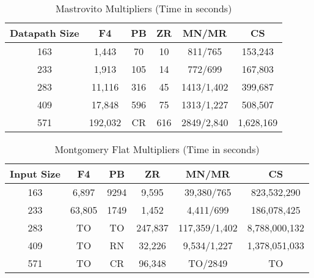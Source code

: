 \documentclass{article}
\begin{document}
\begin{table}
\centering
\caption{Mastrovito Multipliers (Time in seconds)}
\begin{tabular}{| c | c | c | c | c | c |} \hline
\textbf{Datapath Size} & \textbf{F4} & \textbf{PB} &\textbf{ZR} & \textbf{MN/MR} & \textbf{CS}\\ \hline
163 & 1,443 &70& 10 & 811/765 & 153,243\\ \hline 
233 & 1,913 &105& 14 & 772/699& 167,803\\ \hline
283 & 11,116 &316& 45 & 1413/1,402&399,687\\ \hline
409 & 17,848 &596& 75 & 1313/1,227&508,507\\ \hline
571 & 192,032 &CR& 616 & 2849/2,840&1,628,169\\ \hline 


\end{tabular}
\end{table}



\begin{table}
\centering
\caption{Montgomery Flat Multipliers (Time in seconds)}
\begin{tabular}{| c | c | c | c | c | c |} \hline
\textbf{Input Size} & \textbf{F4} & \textbf{PB} &\textbf{ZR} & \textbf{MN/MR} & \textbf{CS}\\ \hline
163 & 6,897 &9294&9,595 & 39,380/765 & 823,532,290\\ \hline 
233 & 63,805 &1749&1,452&4,411/699 & 186,078,425\\ \hline
283 & TO &TO& 247,837 &117,359/1,402 &8,788,000,132\\ \hline
409 & TO & RN& 32,226 &9,534/1,227 &1,378,051,033\\ \hline
571 & TO &CR& 96,348& TO/2849 & TO\\ \hline 

\end{tabular}
\end{table}
\end{document}
